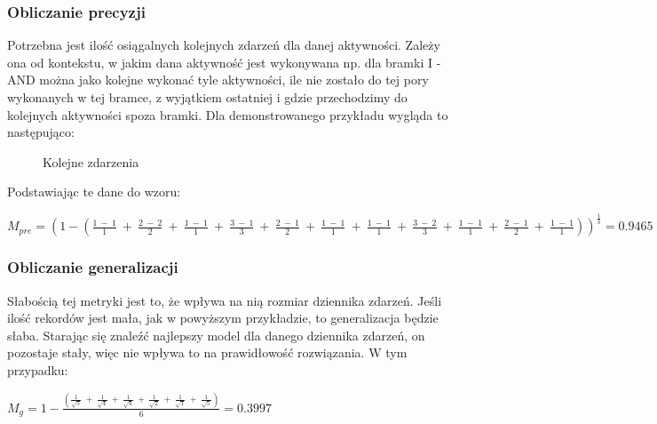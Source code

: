 \subsubsection{Obliczanie precyzji}
Potrzebna jest ilość osiągalnych kolejnych zdarzeń dla danej aktywności. Zależy ona od kontekstu, w jakim dana aktywność jest wykonywana np. dla bramki I - AND można jako kolejne wykonać tyle aktywności, ile nie zostało do tej pory wykonanych w tej bramce, z wyjątkiem ostatniej i gdzie przechodzimy do kolejnych aktywności spoza bramki. Dla demonstrowanego przykładu wygląda to następująco:

\begin{figure}[h]
	\caption{\label{fig:directly-follows}Kolejne zdarzenia}
\end{figure}

Podstawiając te dane do wzoru:
\begin{center}
$M_{pre} = (1 - (\frac{1\ -\ 1}{1}\ +\ \frac{2\ -\ 2}{2}\ +\ \frac{1\ -\ 1}{1}\ +\ \frac{3\ -\ 1}{3}\ +\ \frac{2\ -\ 1}{2}\ +\ \frac{1\ -\ 1}{1}\ +\ \frac{1\ -\ 1}{1}\ +\ \frac{3\ -\ 2}{3}\ +\ \frac{1\ -\ 1}{1}\ +\ \frac{2\ -\ 1}{2}\ +\ \frac{1\ -\ 1}{1}))^{\frac{1}{3}} = 0.9465 $
\end{center}

\subsubsection{Obliczanie generalizacji}
Słabością tej metryki jest to, że wpływa na nią rozmiar dziennika zdarzeń. Jeśli ilość rekordów jest mała, jak w powyższym przykładzie, to generalizacja będzie słaba. Starając się znaleźć najlepszy model dla danego dziennika zdarzeń, on pozostaje stały, więc nie wpływa to na prawidłowość rozwiązania. W tym przypadku:
\begin{center}
$M_g = 1 - \frac{(\frac{1}{\sqrt{5}}\ +\ \frac{1}{\sqrt{4}}\ +\ \frac{1}{\sqrt{4}}\ +\ \frac{1}{\sqrt{2}}\ +\ \frac{1}{\sqrt{1}}\ +\ \frac{1}{\sqrt{5}})}{6} = 0.3997$
\end{center}

